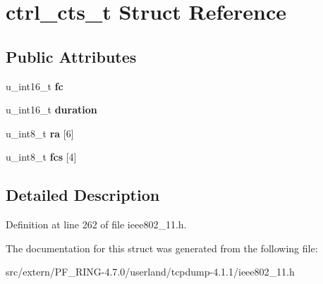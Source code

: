 \hypertarget{structctrl__cts__t}{
\section{ctrl\_\-cts\_\-t Struct Reference}
\label{structctrl__cts__t}
}
\subsection*{Public Attributes}
\begin{DoxyCompactItemize}
\item 
\hypertarget{structctrl__cts__t_ae225028f1a97092afca58637620ecf16}{
u\_\-int16\_\-t {\bfseries fc}}
\label{structctrl__cts__t_ae225028f1a97092afca58637620ecf16}

\item 
\hypertarget{structctrl__cts__t_af9d6c5e67b097c349b7a960bba4f61aa}{
u\_\-int16\_\-t {\bfseries duration}}
\label{structctrl__cts__t_af9d6c5e67b097c349b7a960bba4f61aa}

\item 
\hypertarget{structctrl__cts__t_aea74b845f9f41df8a11a217a9c739462}{
u\_\-int8\_\-t {\bfseries ra} \mbox{[}6\mbox{]}}
\label{structctrl__cts__t_aea74b845f9f41df8a11a217a9c739462}

\item 
\hypertarget{structctrl__cts__t_aca68d95b4d0e92af67a193de4ce3b1ce}{
u\_\-int8\_\-t {\bfseries fcs} \mbox{[}4\mbox{]}}
\label{structctrl__cts__t_aca68d95b4d0e92af67a193de4ce3b1ce}

\end{DoxyCompactItemize}


\subsection{Detailed Description}


Definition at line 262 of file ieee802\_\-11.h.



The documentation for this struct was generated from the following file:\begin{DoxyCompactItemize}
\item 
src/extern/PF\_\-RING-\/4.7.0/userland/tcpdump-\/4.1.1/ieee802\_\-11.h\end{DoxyCompactItemize}

